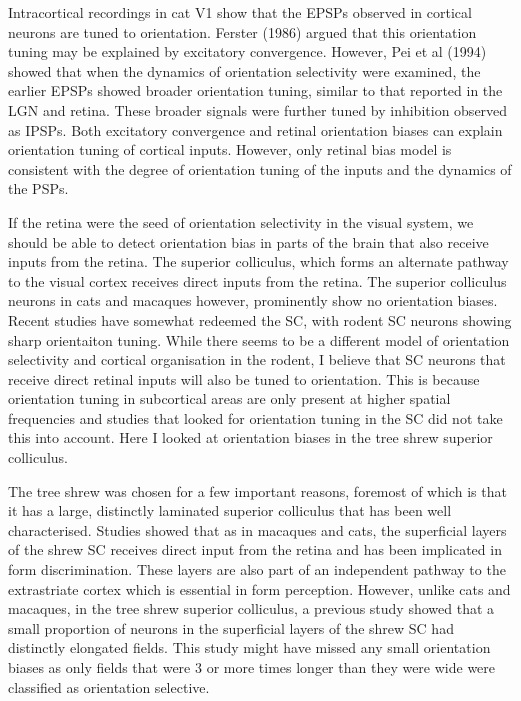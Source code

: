 	 Intracortical recordings in cat V1 show that the EPSPs observed in cortical neurons are tuned to orientation. Ferster (1986) argued that this orientation tuning may be explained by excitatory convergence. However, Pei et al (1994) showed that when the dynamics of orientation selectivity were examined, the earlier EPSPs showed broader orientation tuning, similar to that reported in the LGN and retina. These broader signals were further tuned by inhibition observed as IPSPs. Both excitatory convergence and retinal orientation biases can explain orientation tuning of cortical inputs. However, only retinal bias model is consistent with the degree of orientation tuning of the inputs and the dynamics of the PSPs.
	 
 
	If the retina were the seed of orientation selectivity in the visual system, we should be able to detect orientation bias in parts of the brain that also receive inputs from the retina. The superior colliculus, which forms an alternate pathway to the visual cortex receives direct inputs from the retina. The superior colliculus neurons in cats and macaques however, prominently show no orientation biases. Recent studies have somewhat redeemed the SC, with rodent SC neurons showing sharp orientaiton tuning. While there seems to be a different model of orientation selectivity and cortical organisation in the rodent, I believe that SC neurons that receive direct retinal inputs will also be tuned to orientation. This is because orientation tuning in subcortical areas are only present at higher spatial frequencies and studies that looked for orientation tuning in the SC did not take this into account. Here I looked at orientation biases in the tree shrew superior colliculus.
	
	The tree shrew was chosen for a few important reasons, foremost of which is that it has a large, distinctly laminated superior colliculus that has been well characterised. Studies showed that as in macaques and cats, the superficial layers of the shrew SC receives direct input from the retina and has been implicated in form discrimination. These layers are also part of an independent pathway to the extrastriate cortex which is essential in form perception. However, unlike cats and macaques, in the tree shrew superior colliculus, a previous study showed that a small proportion of neurons in the superficial layers of the shrew SC had distinctly elongated fields. This study might have missed any small orientation biases as only fields that were 3 or more times longer than they were wide were classified as orientation selective.
	
